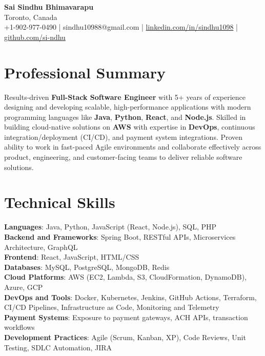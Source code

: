 \documentclass[letterpaper,11pt]{article}
\begin{document}
\begin{center}
  {\Large \textbf{Sai Sindhu Bhimavarapu}} \\
  Toronto, Canada \\
  +1-902-977-0490 \enspace | \enspace sindhu10988@gmail.com \enspace | \enspace \href{https://www.linkedin.com/in/sindhu1098/}{linkedin.com/in/sindhu1098} \enspace | \enspace \href{https://github.com/si-ndhu}{github.com/si-ndhu}
\end{center}

\section{Professional Summary}
  \begin{itemize}[leftmargin=0.15in, label={}]
    \small{\item{
     Results-driven \textbf{Full-Stack Software Engineer} with 5+ years of experience designing and developing scalable, high-performance applications with modern programming languages like \textbf{Java}, \textbf{Python}, \textbf{React}, and \textbf{Node.js}. Skilled in building cloud-native solutions on \textbf{AWS} with expertise in \textbf{DevOps}, continuous integration/deployment (CI/CD), and payment system integrations. Proven ability to work in fast-paced Agile environments and collaborate effectively across product, engineering, and customer-facing teams to deliver reliable software solutions.
    }}
  \end{itemize}
\vspace{-16pt}

\section{Technical Skills}
 \begin{itemize}[leftmargin=0.15in, label={}]
    \small{\item{
     \textbf{Languages}: Java, Python, JavaScript (React, Node.js), SQL, PHP \\
     \textbf{Backend and Frameworks}: Spring Boot, RESTful APIs, Microservices Architecture, GraphQL \\
     \textbf{Frontend}: React, JavaScript, HTML/CSS \\
     \textbf{Databases}: MySQL, PostgreSQL, MongoDB, Redis \\
     \textbf{Cloud Platforms}: AWS (EC2, Lambda, S3, CloudFormation, DynamoDB), Azure, GCP \\
     \textbf{DevOps and Tools}: Docker, Kubernetes, Jenkins, GitHub Actions, Terraform, CI/CD Pipelines, Infrastructure as Code, Monitoring and Telemetry \\
     \textbf{Payment Systems}: Exposure to payment gateways, ACH APIs, transaction workflows \\
     \textbf{Development Practices}: Agile (Scrum, Kanban, XP), Code Reviews, Unit Testing, SDLC Automation, JIRA
    }}
 \end{itemize}
\vspace{-16pt}
\end{document}
